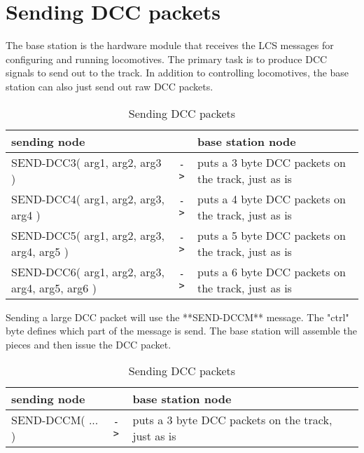 \section{Sending DCC packets}

The base station is the hardware module that receives the LCS messages for configuring and running locomotives. The primary task is to produce DCC signals to send out to the track. In addition to controlling locomotives, the base station can also just send out raw DCC packets.

\begin{table}[ht!]
    \begin{center}
        \caption{Sending DCC packets}
        \begin{tabular}{|p{} c p{}|}
            \toprule
            \textbf{sending node} & & \textbf{ base station node} \\
            \midrule
            SEND-DCC3( arg1, arg2, arg3 ) & \texttt{->} & puts a 3 byte DCC packets on the track, just as is \\
            SEND-DCC4( arg1, arg2, arg3, arg4 ) & \texttt{->} & puts a 4 byte DCC packets on the track, just as is \\
            SEND-DCC5( arg1, arg2, arg3, arg4, arg5 ) & \texttt{->} & puts a 5 byte DCC packets on the track, just as is \\
            SEND-DCC6( arg1, arg2, arg3, arg4, arg5, arg6 ) & \texttt{->} & puts a 6 byte DCC packets on the track, just as is \\
            \bottomrule
        \end{tabular}
    \end{center}
\end{table}

Sending a large DCC packet will use the **SEND-DCCM** message. The "ctrl" byte defines which part of the message is send. The base station will assemble the pieces and then issue the DCC packet. 

\begin{table}[ht!]
    \begin{center}
        \caption{Sending DCC packets}
        \begin{tabular}{|p{} c p{}|}
            \toprule
            \textbf{sending node} & & \textbf{ base station node} \\
            \midrule
            SEND-DCCM( ... ) & \texttt{->} & puts a 3 byte DCC packets on the track, just as is \\
            \bottomrule
        \end{tabular}
    \end{center}
\end{table}

